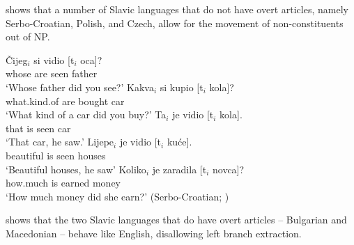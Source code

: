 \documentclass[output=paper,
colorlinks,
citecolor=brown,
newtxmath
]{langscibook}
\begin{document}
\noindent \citet{Boskovic2005a} shows that a number of Slavic languages that do not have overt articles, namely Serbo-Croatian, Polish, and Czech, allow for the movement of non-constituents out of NP.


\ea\label{serbo-croatian}
    \ea \gll Čijeg$_i$ si vidio [t$_i$ oca]?\\
    whose are seen {}{} father\\
    \glt `Whose father did you see?'
    \ex \gll Kakva$_i$ si kupio [t$_i$ kola]?\\
    what.kind.of are bought {}{} car\\
    \glt `What kind of a car did you buy?'
    \ex \gll Ta$_i$ je vidio [t$_i$ kola].\\
    that is seen {}{} car\\
    \glt `That car, he saw.'
    \ex \gll Lijepe$_i$ je vidio [t$_i$ kuće].\\
    beautiful is seen {}{} houses\\
    \glt `Beautiful houses, he saw'
    \ex \gll Koliko$_i$ je zaradila [t$_i$ novca]?\\
    how.much is earned {}{} money\\
    \glt `How much money did she earn?' \hfill (Serbo-Croatian; \citealt{Boskovic2005a})
\z\z

\noindent \citeauthor{Boskovic2005a} shows that the two Slavic languages that do have overt articles -- Bulgarian and Macedonian -- behave like English, disallowing %
left branch extraction. %


\ea\label{Bulgarian}
\z\z


\ea\label{Macedonian}       
\z\z
\end{document}
